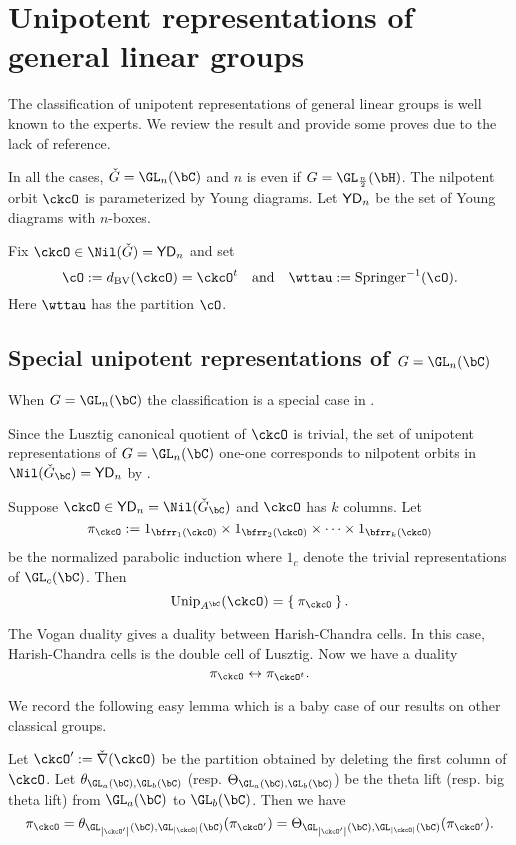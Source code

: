 \documentclass[counting_main.tex]{subfiles}
\begin{document}
\section{Unipotent representations of general linear groups}

The classification of unipotent representations of general linear groups is well
known to the experts. We review the result and provide some proves due to the
lack of reference.


In all the cases, $\ckG = \GL_{n}(\bC)$ and $n$ is even if
$G = \GL_{\frac{n}{2}}(\bH)$.
The nilpotent orbit $\ckcO$ is parameterized by Young diagrams.
Let $\mathsf{YD}_{n}$ be the set of Young diagrams with $n$-boxes.

Fix $\ckcO\in \Nil(\ckG) = \YD_{n}$ and set
\[
  \cO :=\dBV(\ckcO) = \ckcO^{t} \AND \wttau := \Spr^{-1}(\cO).
\]
Here $\wttau$ has the partition $\cO$.



\subsection{Special unipotent representations of $G = \GL_n(\bC)$}
When $G = \GL_{n}(\bC)$ the classification is a special case in \cite{BVUni}.

Since the Lusztig canonical quotient of $\ckcO$ is trivial, the set of unipotent representations
of $G = \GL_n(\bC)$ one-one corresponds to nilpotent orbits in $\Nil(\ckGc) = \YD_{n}$ by
\cite{BVUni}.

\begin{thm}
Suppose $\ckcO\in \YD_{n} = \Nil(\ckGc)$ and $\ckcO$ has $k$ columns.
Let
\[
 \pi_{\ckcO} := 1_{\bfrr_1(\ckcO)}\times  1_{\bfrr_2(\ckcO)}\times \cdots
 \times 1_{\bfrr_k(\ckcO)}
\]
be the normalized parabolic induction where $1_{c}$ denote the trivial
representations of $\GL_c(\bC)$.
Then
\[
  \Unip_{A^{\bC}}(\ckcO) = \Set{\pi_{\ckcO}}.
\]
\end{thm}


\begin{remark}
The Vogan duality gives a duality between Harish-Chandra cells.
In this case, Harish-Chandra cells is the double cell
of Lusztig.
Now we have a duality
\[
 \pi_\ckcO \leftrightarrow \pi_{\ckcO^t}.
\]
\end{remark}

We record the following easy lemma which is a baby case of our results on other
classical groups.
\begin{lem}
  Let $\ckcO' := \DDD(\ckcO)$ be the partition obtained by deleting the first
  column of $\ckcO$. Let $\theta_{\GL_{a}(\bC),\GL_{b}(\bC)}$ (resp.
  $\Theta_{\GL_{a}(\bC),\GL_{b}(\bC)}$) be the theta lift (resp. big theta lift)
  from $\GL_a(\bC)$ to $\GL_b(\bC)$. Then we have
  \[
    \pi_{\ckcO} = \theta_{\GL_{\abs{\ckcO'}}(\bC),\GL_{\abs{\ckcO}}(\bC)} (\pi_{\ckcO'})= \Theta_{\GL_{\abs{\ckcO'}}(\bC),\GL_{\abs{\ckcO}}(\bC)} (\pi_{\ckcO'}).
  \]
\end{lem}
\end{document}

